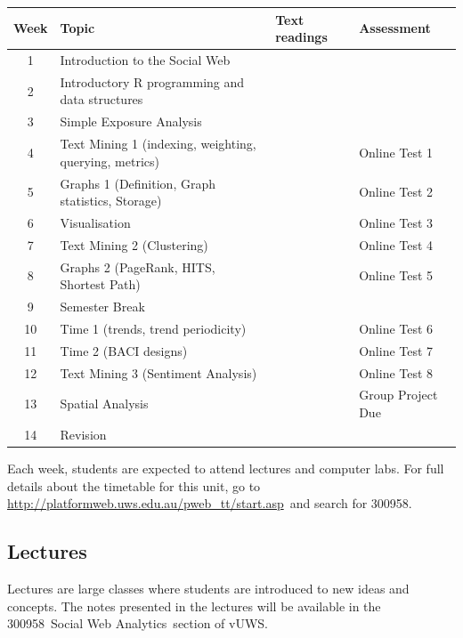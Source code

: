 \documentclass[a4paper,oneside]{book}
\newcommand{\vuws}{vUWS}
\newcommand{\unitcode}{300958}
\newcommand{\unitname}{Social Web Analytics}
\newcommand{\timetablelink}{\url{http://platformweb.uws.edu.au/pweb_tt/start.asp}}
\begin{document}
\noindent
\renewcommand{\arraystretch}{1.3}
\begin{longtable}{|c|>{\raggedright}p{}|>{\raggedright}p{}|>{\raggedright\arraybackslash}p{}|}
\hline
Week & Topic & Text readings & Assessment \\
\hline
1 & Introduction to the Social Web  & & \\
\hline
2 & Introductory R programming and data structures &  & \\
\hline
3 & Simple Exposure Analysis &  & \\
\hline
4 & Text Mining 1 (indexing, weighting, querying, metrics) &  & Online Test 1 \\
\hline
5 & Graphs 1 (Definition, Graph statistics, Storage) & &  Online Test 2 \\
\hline
6 & Visualisation &  &  Online Test 3 \\
\hline                                            
7 & Text Mining 2 (Clustering) &  &  Online Test 4 \\
\hline                                            
8 & Graphs 2 (PageRank, HITS, Shortest Path) &  & Online Test 5 \\
\hline
9 & Semester Break & &  \\
\hline                                             
10 & Time 1 (trends, trend periodicity)  & & Online Test 6 \\
\hline                                            
11 & Time 2 (BACI designs) &  & Online Test 7 \\
\hline
12 & Text Mining 3 (Sentiment Analysis) &  & Online Test 8  \\
\hline
13 & Spatial Analysis &  & Group Project Due \\
\hline                                            
14 & Revision &  & \\                
\hline
\end{longtable}


Each week, students are expected to attend lectures and
computer labs. For full details about the timetable for this unit, go to
\timetablelink~and search for \unitcode.



\subsection*{Lectures}

Lectures are large classes where students are introduced to new ideas
and concepts. The notes presented in the lectures will be available in
the \unitcode~\unitname~section of \vuws.
\end{document}
